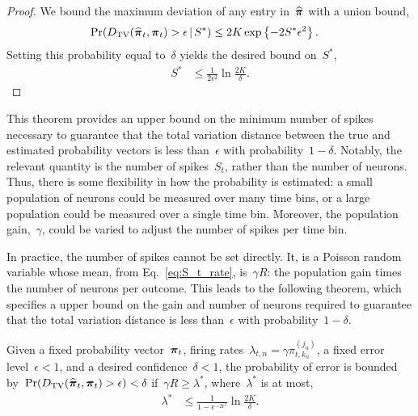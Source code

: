 \begin{proof}
We bound the maximum deviation of any entry in~$\widehat{\boldsymbol{\pi}}$ with a union bound,
\begin{align}
  \Pr({D_{\mathrm{TV}}}(\widehat{\boldsymbol{\pi}}_t, \boldsymbol{\pi}_t) > \epsilon \,|\, S^*) 
  & \leq 2K \exp \left\{-2S^* \epsilon^2 \right\}.
\end{align}
Setting this probability equal to~$\delta$ yields the desired bound on~$S^*$,
\begin{align}
  S^* &\leq \frac{1}{2\epsilon^2} \ln \frac{2K}{\delta}.
\end{align}

\end{proof}


This theorem provides an upper bound on the minimum number of spikes necessary to 
guarantee that the total variation distance between the true and estimated 
probability vectors is less than~$\epsilon$ with probability~$1-\delta$. 
Notably, the relevant quantity is the number of spikes~$S_t$, rather than 
the number of neurons. Thus, there is some flexibility in how the probability 
is estimated: a small population of neurons could be measured over many time bins,
or a large population could be measured over a single time bin. Moreover, the 
population gain,~$\gamma$, could be varied to adjust the number of spikes 
per time bin. 


In practice, the number of spikes cannot be set directly. It, is a
Poisson random variable whose mean, from Eq.~\ref{eq:S_t_rate},
is~$\gamma R$: the population gain times the number of neurons per
outcome. This leads to the following theorem, which specifies a upper bound 
on the gain and number of neurons required to guarantee that the 
total variation distance is less than~$\epsilon$ with probability~$1-\delta$.

\begin{theorem}
  \label{thm:rate_bounds}
  Given a fixed probability vector~$\boldsymbol{\pi}_t$, firing
  rates~$\lambda_{t,n} = \gamma \pi_{t,k_n}^{(j_n)}$, a fixed error
  level~$\epsilon < 1$, and a desired confidence~$\delta < 1$, the
  probability of error is bounded
  by~$\Pr({D_{\mathrm{TV}}}(\widehat{\boldsymbol{\pi}}_t, \boldsymbol{\pi}_t) > \epsilon) < \delta$
  if~$\gamma R \geq \lambda^*$, where~$\lambda^*$ is at most,
  \begin{align}
    \lambda^* &\leq \frac{1}{1-e^{-2\epsilon^2}} \ln \frac{2K}{\delta}.  
  \end{align}
\end{theorem}

